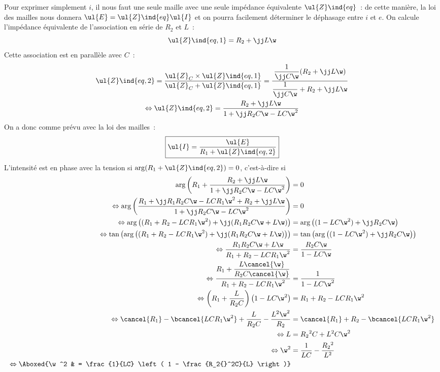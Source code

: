 \documentclass[a4paper, 12pt, final, garamond]{book}
\begin{document}
Pour exprimer simplement $i$, il nous faut une seule maille avec une seule
impédance équivalente $\ul{Z}\ind{eq}$~: de cette manière, la loi des mailles nous
donnera $\ul{E} = \ul{Z}\ind{eq}\ul{I}$ et on pourra facilement déterminer le
déphasage entre $i$ et $e$. \bigbreak
On calcule l'impédance équivalente de l'association en série de $R_2$ et $L$~:
\[\ul{Z}\ind{eq,1} = R_2 + \jj L\w\]
Cette association est en parallèle avec $C$~:
\begin{gather*}
	\ul{Z}\ind{eq, 2}
	= \frac{\ul{Z}_C\times\ul{Z}\ind{eq, 1}}{\ul{Z}_C + \ul{Z}\ind{eq,1}}
	= \frac{\dfrac{1}{\jj C\w}(R_2 + \jj L\w)}{\dfrac{1}{\jj C\w} + R_2 +
		\jj L\w}\\
	\Leftrightarrow
	\ul{Z}\ind{eq,2} = \frac{R_2 + \jj L\w}{1+\jj R_2C\w - LC\w^2}
\end{gather*}
On a donc comme prévu avec la loi des mailles~:
\[\boxed{\ul{I} = \frac{\ul{E}}{R_1 + \ul{Z}\ind{eq,2}}}\]
L'intensité est en phase avec la tension si $\arg(R_1 + \ul{Z}\ind{eq,2}) = 0$,
c'est-à-dire si
\begin{align*}
	\arg\left(R_1 + \frac{R_2 + \jj L\w}{1 + \jj R_2C\w - LC\w^2}\right)
	 & = 0                                                            \\
	\Leftrightarrow
	\arg \left( \frac{R_1 + \jj R_1R_2C\w - LCR_1\w^2 + R_2 + \jj L\w}
	{1 + \jj R_2 C\w - LC\w^2} \right)
	 & = 0                                                            \\
	\Leftrightarrow
	\arg \left( (R_1 + R_2 - LCR_1\w^2) + \jj(R_1R_2C\w + L\w) \right)
	 & = \arg \left( (1-LC\w^2) + \jj R_2C\w \right)                  \\
	\Leftrightarrow
	\tan \left(\arg \left( (R_1 + R_2 - LCR_1\w^2) + \jj(R_1R_2C\w + L\w) \right)\right)
	 & = \tan\left(\arg \left( (1-LC\w^2) + \jj R_2C\w \right)\right) \\
	\Leftrightarrow
	\frac{R_1R_2C\w + L\w}{R_1 + R_2 - LCR_1\w^2}
	 & = \frac{R_2C\w}{1-LC\w}                                        \\
	\Leftrightarrow
	\frac{R_1 + \dfrac{L\cancel{\w}}{R_2C\cancel{\w}}}{R_1 + R_2 - LCR_1\w^2}
	 & = \frac{1}{1-LC\w^2}                                           \\
	\Leftrightarrow
	\left( R_1 + \frac{L}{R_2C} \right) \left( 1-LC\w^2 \right)
	 & = R_1 + R_2 - LCR_1\w^2                                        \\
	\Leftrightarrow
	\cancel{R_1} - \bcancel{LCR_1\w^2} + \frac{L}{R_2C} - \frac{L^2\w^2}{R_2}
	 & = \cancel{R_1} + R_2 - \bcancel{LCR_1\w^2}                     \\
	\Leftrightarrow
	L
	 & = R_2{}^2 C + L^2C\w^2                                         \\
	\Leftrightarrow
	\w^2
	 & = \frac{1}{LC} - \frac{R_2{}^2}{L^2}                           \\
	\Leftrightarrow
	\Aboxed{\w^2
	 & = \frac{1}{LC} \left( 1 - \frac{R_2{}^2C}{L} \right)}
\end{align*}
\end{document}
